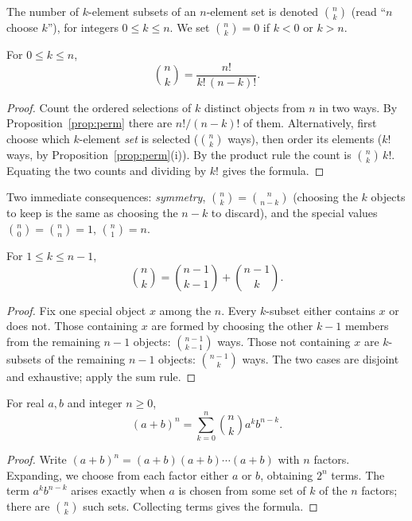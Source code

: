 \begin{definition}
The number of $k$-element subsets of an $n$-element set is denoted
$\binom{n}{k}$ (read ``$n$ choose $k$''), for integers $0\le k\le n$. We set
$\binom{n}{k}=0$ if $k<0$ or $k>n$.
\end{definition}

\begin{theorem}\label{thm:choose}
For $0\le k\le n$,
\[
\binom{n}{k}=\frac{n!}{k!\,(n-k)!}.
\]
\end{theorem}
\begin{proof}
Count the ordered selections of $k$ distinct objects from $n$ in two ways. By
Proposition~\ref{prop:perm} there are $n!/(n-k)!$ of them. Alternatively, first
choose which $k$-element \emph{set} is selected ($\binom nk$ ways), then order
its elements ($k!$ ways, by Proposition~\ref{prop:perm}(i)). By the product
rule the count is $\binom nk\,k!$. Equating the two counts and dividing by
$k!$ gives the formula.
\end{proof}

Two immediate consequences: \emph{symmetry}, $\binom nk=\binom n{n-k}$
(choosing the $k$ objects to keep is the same as choosing the $n-k$ to discard),
and the special values $\binom n0=\binom nn=1$, $\binom n1=n$.

\begin{theorem}\label{thm:pascal}
For $1\le k\le n-1$,
\[
\binom nk=\binom{n-1}{k-1}+\binom{n-1}{k}.
\]
\end{theorem}
\begin{proof}
Fix one special object $x$ among the $n$. Every $k$-subset either contains $x$
or does not. Those containing $x$ are formed by choosing the other $k-1$
members from the remaining $n-1$ objects: $\binom{n-1}{k-1}$ ways. Those not
containing $x$ are $k$-subsets of the remaining $n-1$ objects:
$\binom{n-1}{k}$ ways. The two cases are disjoint and exhaustive; apply the sum
rule.
\end{proof}

\begin{theorem}\label{thm:binomial}
For real $a,b$ and integer $n\ge 0$,
\[
(a+b)^n=\sum_{k=0}^n\binom nk a^k b^{n-k}.
\]
\end{theorem}
\begin{proof}
Write $(a+b)^n=(a+b)(a+b)\cdots(a+b)$ with $n$ factors. Expanding, we choose
from each factor either $a$ or $b$, obtaining $2^n$ terms. The term $a^kb^{n-k}$
arises exactly when $a$ is chosen from some set of $k$ of the $n$ factors; there
are $\binom nk$ such sets. Collecting terms gives the formula.
\end{proof}


